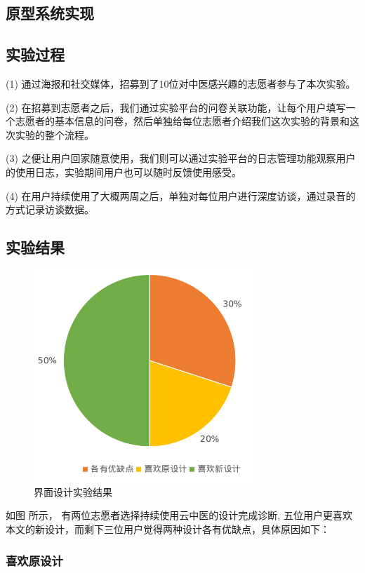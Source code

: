 \subsection{原型系统实现}


\subsection{实验过程}

(1) 通过海报和社交媒体，招募到了10位对中医感兴趣的志愿者参与了本次实验。

(2) 在招募到志愿者之后，我们通过实验平台的问卷关联功能，让每个用户填写一个志愿者的基本信息的问卷，然后单独给每位志愿者介绍我们这次实验的背景和这次实验的整个流程。

(3) 之便让用户回家随意使用，我们则可以通过实验平台的日志管理功能观察用户的使用日志，实验期间用户也可以随时反馈使用感受。

(4)  在用户持续使用了大概两周之后，单独对每位用户进行深度访谈，通过录音的方式记录访谈数据。



\subsection{实验结果}


\begin{figure}[ht]
    \centering
    \includegraphics[height=8cm]{images/ui-exp.png}
    \caption{界面设计实验结果}
    \label{fig:ui-exp}
\end{figure}

如图 \cite{fig:ui-exp}所示， 有两位志愿者选择持续使用云中医的设计完成诊断, 五位用户更喜欢本文的新设计，而剩下三位用户觉得两种设计各有优缺点，具体原因如下：

\subsubsection{喜欢原设计}

